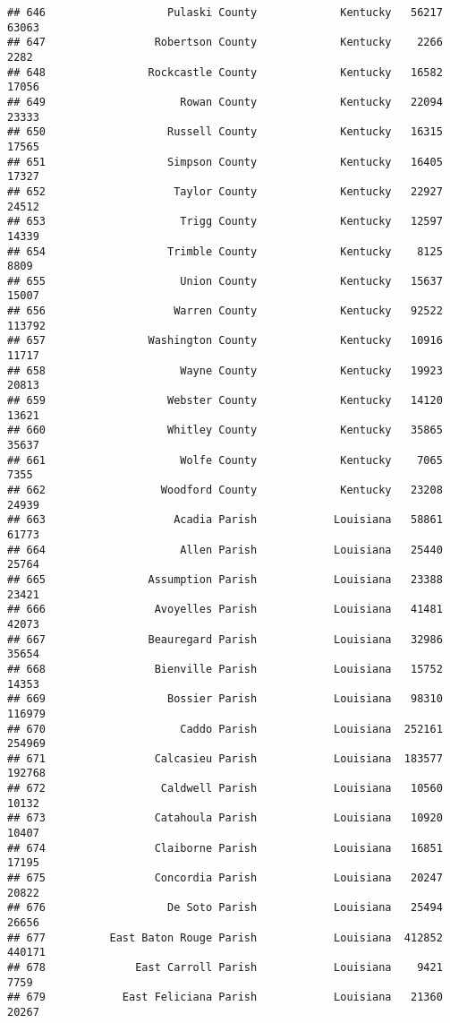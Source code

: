 \documentclass[
]{article}
\begin{document}
\begin{verbatim}
## 646                   Pulaski County             Kentucky   56217   63063
## 647                 Robertson County             Kentucky    2266    2282
## 648                Rockcastle County             Kentucky   16582   17056
## 649                     Rowan County             Kentucky   22094   23333
## 650                   Russell County             Kentucky   16315   17565
## 651                   Simpson County             Kentucky   16405   17327
## 652                    Taylor County             Kentucky   22927   24512
## 653                     Trigg County             Kentucky   12597   14339
## 654                   Trimble County             Kentucky    8125    8809
## 655                     Union County             Kentucky   15637   15007
## 656                    Warren County             Kentucky   92522  113792
## 657                Washington County             Kentucky   10916   11717
## 658                     Wayne County             Kentucky   19923   20813
## 659                   Webster County             Kentucky   14120   13621
## 660                   Whitley County             Kentucky   35865   35637
## 661                     Wolfe County             Kentucky    7065    7355
## 662                  Woodford County             Kentucky   23208   24939
## 663                    Acadia Parish            Louisiana   58861   61773
## 664                     Allen Parish            Louisiana   25440   25764
## 665                Assumption Parish            Louisiana   23388   23421
## 666                 Avoyelles Parish            Louisiana   41481   42073
## 667                Beauregard Parish            Louisiana   32986   35654
## 668                 Bienville Parish            Louisiana   15752   14353
## 669                   Bossier Parish            Louisiana   98310  116979
## 670                     Caddo Parish            Louisiana  252161  254969
## 671                 Calcasieu Parish            Louisiana  183577  192768
## 672                  Caldwell Parish            Louisiana   10560   10132
## 673                 Catahoula Parish            Louisiana   10920   10407
## 674                 Claiborne Parish            Louisiana   16851   17195
## 675                 Concordia Parish            Louisiana   20247   20822
## 676                   De Soto Parish            Louisiana   25494   26656
## 677          East Baton Rouge Parish            Louisiana  412852  440171
## 678              East Carroll Parish            Louisiana    9421    7759
## 679            East Feliciana Parish            Louisiana   21360   20267

\end{verbatim}
\end{document}
